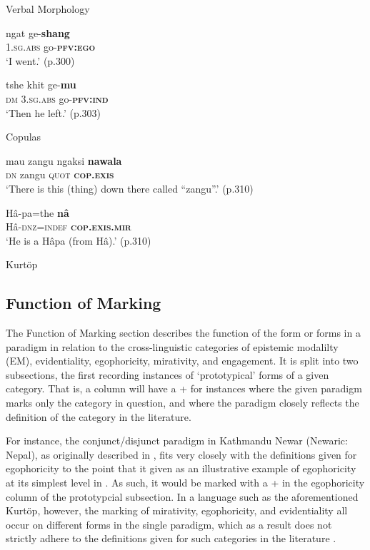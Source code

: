 \begin{exe}
\ex Verbal Morphology \label{e:Methods:KurtopScope1}
\begin{xlist}
\ex
\gll ngat ge-\textbf{shang} \\
1.\textsc{sg.abs} go-\textsc{\textbf{pfv:ego}} \\
\glt `I went.' (p.300)

\ex
\gll tshe khit ge-\textbf{mu} \\
\textsc{dm} \textsc{3.sg.abs} go-\textsc{\textbf{pfv:ind}} \\
\glt `Then he left.' (p.303)

\end{xlist}

\ex Copulas \label{e:Methods:KurtopScope2}
\begin{xlist}
\ex 
\gll mau zangu ngaksi \textbf{nawala} \\
\textsc{dn} zangu \textsc{quot} \textsc{\textbf{cop.exis}} \\
\glt `There is this (thing) down there called ``zangu''.' (p.310)

\ex
\gll Hâ-pa=the \textbf{nâ} \\
Hâ-\textsc{dnz=indef} \textsc{\textbf{cop.exis.mir}} \\
\glt `He is a Hâpa (from Hâ).' (p.310)
\end{xlist}
Kurtöp \cite[East Bodish: Bhutan,][]{Hyslop2017}
\end{exe}

\subsection{Function of Marking}
The Function of Marking section describes the function of the form or forms in a paradigm in relation to the cross-linguistic categories of epistemic modalilty (EM), evidentiality, egophoricity, mirativity, and engagement. It is split into two subsections, the first recording instances of `prototypical' forms of a given category. That is, a column will have a + for instances where the given paradigm marks only the category in question, and where the paradigm closely reflects the definition of the category in the literature.

For instance, the conjunct/disjunct paradigm in Kathmandu Newar (Newaric: Nepal), as originally described in , fits very closely with the definitions given for egophoricity to the point that it given as an illustrative example of egophoricity at its simplest level in . As such, it would be marked with a + in the egophoricity column of the prototypcial subsection. In a language such as the aforementioned Kurtöp, however, the marking of mirativity, egophoricity, and evidentiality all occur on different forms in the single paradigm, which as a result does not strictly adhere to the definitions given for such categories in the literature \cites{DeLancey2012}{EgoIntro}{Aikhenvald2018Intro}.

